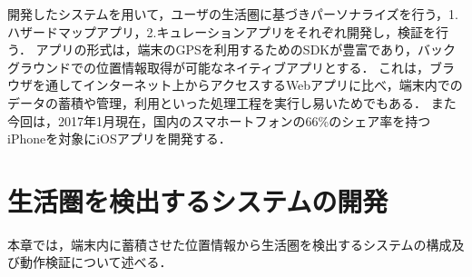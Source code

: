 \documentclass[a4paper]{jsarticle}
\begin{document}
開発したシステムを用いて，ユーザの生活圏に基づきパーソナライズを行う，1.ハザードマップアプリ，2.キュレーションアプリをそれぞれ開発し，検証を行う．
アプリの形式は，端末のGPSを利用するためのSDKが豊富であり，バックグラウンドでの位置情報取得が可能なネイティブアプリとする．
これは，ブラウザを通してインターネット上からアクセスするWebアプリに比べ，端末内でのデータの蓄積や管理，利用といった処理工程を実行し易いためでもある．
また今回は，2017年1月現在，国内のスマホートフォンの66\%のシェア率を持つiPhoneを対象にiOSアプリを開発する．











\section{生活圏を検出するシステムの開発}
本章では，端末内に蓄積させた位置情報から生活圏を検出するシステムの構成及び動作検証について述べる．
\end{document}
